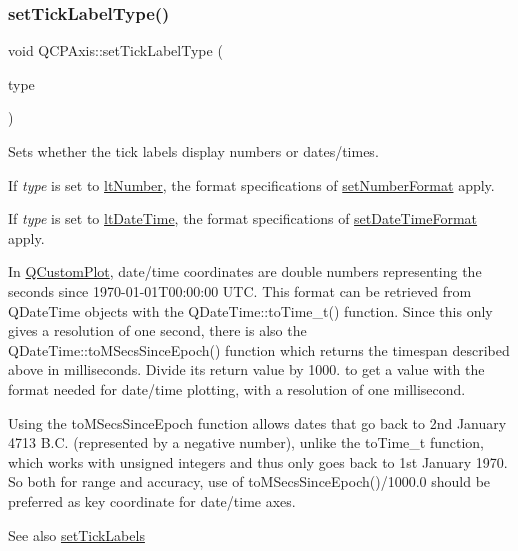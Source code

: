 \subsubsection{\texorpdfstring{set\+Tick\+Label\+Type()}{setTickLabelType()}}
{\footnotesize\ttfamily void Q\+C\+P\+Axis\+::set\+Tick\+Label\+Type (\begin{DoxyParamCaption}\item[{\mbox{\hyperlink{class_q_c_p_axis_a4a7da0166f755f5abac23b765d184cad}{Label\+Type}}}]{type }\end{DoxyParamCaption})}

Sets whether the tick labels display numbers or dates/times.

If {\itshape type} is set to \mbox{\hyperlink{class_q_c_p_axis_a4a7da0166f755f5abac23b765d184cada7f1eacf3b73adaefd334bea04e094b7e}{lt\+Number}}, the format specifications of \mbox{\hyperlink{class_q_c_p_axis_ae585a54dc2aac662e90a2ca82f002590}{set\+Number\+Format}} apply.

If {\itshape type} is set to \mbox{\hyperlink{class_q_c_p_axis_a4a7da0166f755f5abac23b765d184cadafc70594a9d877124dd11ccc187d4ac52}{lt\+Date\+Time}}, the format specifications of \mbox{\hyperlink{class_q_c_p_axis_a2ee0191daa03524a682113e63e05f7a7}{set\+Date\+Time\+Format}} apply.

In \mbox{\hyperlink{class_q_custom_plot}{Q\+Custom\+Plot}}, date/time coordinates are {\ttfamily double} numbers representing the seconds since 1970-\/01-\/01\+T00\+:00\+:00 U\+TC. This format can be retrieved from Q\+Date\+Time objects with the Q\+Date\+Time\+::to\+Time\+\_\+t() function. Since this only gives a resolution of one second, there is also the Q\+Date\+Time\+::to\+M\+Secs\+Since\+Epoch() function which returns the timespan described above in milliseconds. Divide its return value by 1000. to get a value with the format needed for date/time plotting, with a resolution of one millisecond.

Using the to\+M\+Secs\+Since\+Epoch function allows dates that go back to 2nd January 4713 B.\+C. (represented by a negative number), unlike the to\+Time\+\_\+t function, which works with unsigned integers and thus only goes back to 1st January 1970. So both for range and accuracy, use of to\+M\+Secs\+Since\+Epoch()/1000.0 should be preferred as key coordinate for date/time axes.

\begin{DoxySeeAlso}{See also}
\mbox{\hyperlink{class_q_c_p_axis_a04ba16e1f6f78d70f938519576ed32c8}{set\+Tick\+Labels}} 
\end{DoxySeeAlso}
\mbox{\label{class_q_c_p_axis_a62ec40bebe3540e9c1479a8fd2be3b0d}} 
